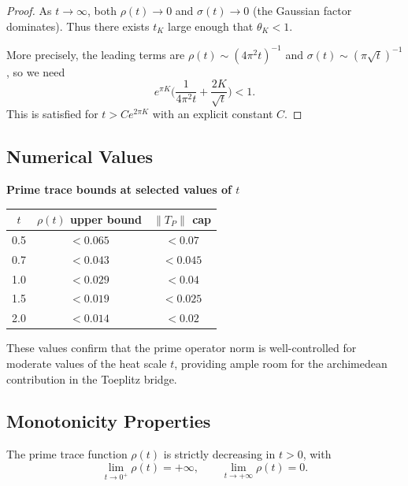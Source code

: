\begin{proof}
As $t \to \infty$, both $\rho(t) \to 0$ and $\sigma(t) \to 0$ (the Gaussian factor dominates). Thus there exists $t_K$ large enough that $\theta_K < 1$.

More precisely, the leading terms are $\rho(t) \sim (4\pi^2 t)^{-1}$ and $\sigma(t) \sim (\pi\sqrt{t})^{-1}$, so we need
\begin{equation}
  e^{\pi K} \Big(\frac{1}{4\pi^2 t} + \frac{2K}{\sqrt{t}}\Big) < 1.
\end{equation}
This is satisfied for $t > C e^{2\pi K}$ with an explicit constant $C$.
\end{proof}

\subsection{Numerical Values}

\begin{center}
\textbf{Prime trace bounds at selected values of $t$}
\end{center}

\begin{center}
\begin{tabular}{ccc}
\toprule
$t$ & $\rho(t)$ upper bound & $\|T_P\|$ cap \\
\midrule
0.5 & $< 0.065$ & $< 0.07$ \\
0.7 & $< 0.043$ & $< 0.045$ \\
1.0 & $< 0.029$ & $< 0.04$ \\
1.5 & $< 0.019$ & $< 0.025$ \\
2.0 & $< 0.014$ & $< 0.02$ \\
\bottomrule
\end{tabular}
\end{center}

\noindent These values confirm that the prime operator norm is well-controlled for moderate values of the heat scale $t$, providing ample room for the archimedean contribution in the Toeplitz bridge.

\subsection{Monotonicity Properties}

\begin{lemma}\label{lem:rho-monotone}
The prime trace function $\rho(t)$ is strictly decreasing in $t > 0$, with
\begin{equation}
  \lim_{t \to 0^+} \rho(t) = +\infty, \qquad \lim_{t \to +\infty} \rho(t) = 0.
\end{equation}
\end{lemma}

